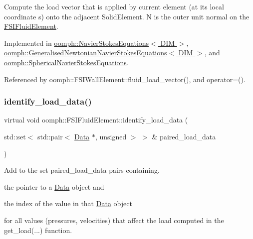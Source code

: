 Compute the load vector that is applied by current element (at its local coordinate s) onto the adjacent Solid\+Element. N is the outer unit normal on the \hyperlink{classoomph_1_1FSIFluidElement}{F\+S\+I\+Fluid\+Element}. 



Implemented in \hyperlink{classoomph_1_1NavierStokesEquations_af2e10e52fc3a54b580e330fd763aa9f5}{oomph\+::\+Navier\+Stokes\+Equations$<$ D\+I\+M $>$}, \hyperlink{classoomph_1_1GeneralisedNewtonianNavierStokesEquations_ad69fe16e07deef80069fb1b27c19caa1}{oomph\+::\+Generalised\+Newtonian\+Navier\+Stokes\+Equations$<$ D\+I\+M $>$}, and \hyperlink{classoomph_1_1SphericalNavierStokesEquations_aedb2bcbc50b05bf623ef544e5ed3bbbf}{oomph\+::\+Spherical\+Navier\+Stokes\+Equations}.



Referenced by oomph\+::\+F\+S\+I\+Wall\+Element\+::fluid\+\_\+load\+\_\+vector(), and operator=().

\mbox{\label{classoomph_1_1FSIFluidElement_a13c5f835cddd1b78e6d2582733619300}} 
\subsubsection{\texorpdfstring{identify\+\_\+load\+\_\+data()}{identify\_load\_data()}}
{\footnotesize\ttfamily virtual void oomph\+::\+F\+S\+I\+Fluid\+Element\+::identify\+\_\+load\+\_\+data (\begin{DoxyParamCaption}\item[{std\+::set$<$ std\+::pair$<$ \hyperlink{classoomph_1_1Data}{Data} $\ast$, unsigned $>$ $>$ \&}]{paired\+\_\+load\+\_\+data }\end{DoxyParamCaption})\hspace{0.3cm}{\ttfamily [pure virtual]}}



Add to the set {\ttfamily paired\+\_\+load\+\_\+data} pairs containing. 


\begin{DoxyItemize}
\item the pointer to a \hyperlink{classoomph_1_1Data}{Data} object and
\item the index of the value in that \hyperlink{classoomph_1_1Data}{Data} object
\end{DoxyItemize}for all values (pressures, velocities) that affect the load computed in the {\ttfamily get\+\_\+load}(...) function. 

